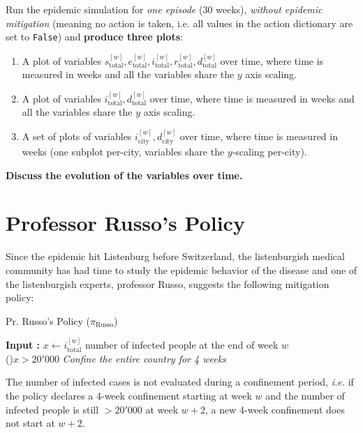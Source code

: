 \documentclass[10pt]{article}
\begin{document}
Run the epidemic simulation for \textit{one episode} ($30$ weeks), \textit{without epidemic mitigation} (meaning no action is taken, i.e. all values in the action dictionary are set to \texttt{False}) and \textbf{produce three plots}:
\begin{enumerate}
  \item A plot of variables $s_\text{total}^{[w]},e_\text{total}^{[w]},i_\text{total}^{[w]},r_\text{total}^{[w]},d_\text{total}^{[w]}$ over time, where time is measured in weeks and all the variables share the $y$ axis scaling.
  \item A plot of variables $i_\text{total}^{[w]},d_\text{total}^{[w]}$ over time, where time is measured in weeks and all the variables share the $y$ axis scaling.
  \item A set of plots of variables $i_\text{city}^{[w]},d_\text{city}^{[w]}$ over time, where time is measured in weeks (one subplot per-city, variables share the $y$-scaling per-city).
\end{enumerate}
\textbf{Discuss the evolution of the variables over time.}

\section{Professor Russo's Policy}

Since the epidemic hit Listenburg before Switzerland, the listenburgish medical community has had time to study the epidemic behavior of the disease and one of the listenburgish experts, professor Russo, suggests the following mitigation policy:

\begin{algorithm}[H]
    \SetAlgoLined
    \caption{Pr. Russo's Policy ($\pi_\text{Russo}$)}
    \textbf{Input : } $x \leftarrow i_\text{total}^{[w]}$ number of infected people at the end of week $w$\\
    \If(){$x > 20'000$}{
      \textit{Confine the entire country for 4 weeks}
    }
\end{algorithm}
The number of infected cases is not evaluated during a confinement period, \emph{i.e.} if the policy declares a 4-week
confinement starting at week $w$ and the number of infected people is still $> 20'000$ at week $w+2$, a new 4-week
confinement does not start at $w+2$.

\subsection*{}
\end{document}
